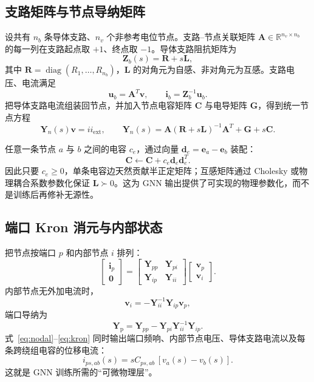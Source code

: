\documentclass[UTF8,11pt,a4paper]{ctexart}
\newcommand{\Yp}{\bm Y_{\mathrm p}}
\newcommand{\RR}{\bm R}
\newcommand{\LL}{\bm L}
\newcommand{\CC}{\bm C}
\newcommand{\GG}{\bm G}
\newcommand{\Inc}{\bm A}
\newcommand{\vv}{\bm v}
\newcommand{\ii}{\bm i}
\begin{document}
\subsection{支路矩阵与节点导纳矩阵}

设共有 $n_b$ 条导体支路、$n_v$ 个非参考电位节点。支路--节点关联矩阵 $\Inc\in\mathbb R^{n_v\times n_b}$ 的每一列在支路起点取 $+1$、终点取 $-1$。导体支路阻抗矩阵为
\begin{equation}
\bm Z_b(s)=\RR+s\LL,
\end{equation}
其中 $\RR=\operatorname{diag}(R_1,\ldots,R_{n_b})$，$\LL$ 的对角元为自感、非对角元为互感。支路电压、电流满足
\begin{equation}
\bm u_b=\Inc^T\vv,\qquad
\bm i_b=\bm Z_b^{-1}\bm u_b.
\end{equation}
把导体支路电流组装回节点，并加入节点电容矩阵 $\CC$ 与电导矩阵 $\GG$，得到统一节点方程
\begin{equation}
\boxed{
\bm Y_n(s)\vv=ii_{\mathrm{ext}},\qquad
\bm Y_n(s)=\Inc(\RR+s\LL)^{-1}\Inc^T+\GG+s\CC.}
\label{eq:nodal}
\end{equation}

任意一条节点 $a$ 与 $b$ 之间的电容 $c_e$，通过向量 $\bm d_e=\bm e_a-\bm e_b$ 装配：
\begin{equation}
\CC\leftarrow\CC+c_e\bm d_e\bm d_e^T.
\end{equation}
因此只要 $c_e\ge0$，单条电容边天然贡献半正定矩阵；互感矩阵通过 Cholesky 或物理耦合系数参数化保证 $\LL\succ0$。这为 GNN 输出提供了可实现的物理参数化，而不是训练后再修补无源性。

\subsection{端口 Kron 消元与内部状态}

把节点按端口 $p$ 和内部节点 $i$ 排列：
\begin{equation}
\begin{bmatrix}\ii_p\\\bm 0\end{bmatrix}
=
\begin{bmatrix}
\bm Y_{pp}&\bm Y_{pi}\\
\bm Y_{ip}&\bm Y_{ii}
\end{bmatrix}
\begin{bmatrix}\vv_p\\\vv_i\end{bmatrix}.
\end{equation}
内部节点无外加电流时，
\begin{equation}
\vv_i=-\bm Y_{ii}^{-1}\bm Y_{ip}\vv_p,
\end{equation}
端口导纳为
\begin{equation}
\boxed{
\Yp=\bm Y_{pp}-\bm Y_{pi}\bm Y_{ii}^{-1}\bm Y_{ip}.}
\label{eq:kron}
\end{equation}
式~\eqref{eq:nodal}--\eqref{eq:kron} 同时输出端口频响、内部节点电压、导体支路电流以及每条跨绕组电容的位移电流：
\begin{equation}
i_{ps,ab}(s)=sC_{ps,ab}\,[v_a(s)-v_b(s)].
\end{equation}
这就是 GNN 训练所需的“可微物理层”。
\end{document}
